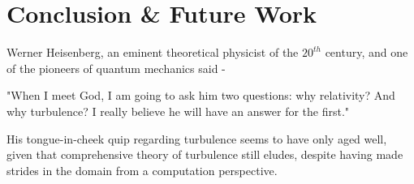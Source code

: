 \chapter{Conclusion \& Future Work} %
\label{Chapter4}

Werner Heisenberg, an eminent theoretical physicist of the $20^{th}$ century, and one of the pioneers of quantum mechanics said -
\begin{displayquote}
    "When I meet God, I am going to ask him two questions: why relativity? And why turbulence? I really believe he will have an answer for the first."
\end{displayquote}
His tongue-in-cheek quip regarding turbulence seems to have only aged well, given that comprehensive theory of turbulence still eludes, despite having made strides in the domain from a computation perspective.